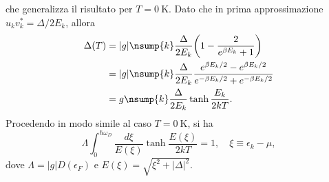 che generalizza il risultato per $T = \SI{0}{\kelvin}$. Dato che in prima approssimazione $u_kv_k^* = \Delta/2E_k$, allora
\begin{equation}
    \begin{split}
        \Delta(T) &= |g|\nsump{k}\frac{\Delta}{2E_k}\bigg(1 - \frac{2}{e^{\beta E_k} + 1}\bigg) \\
        &= |g|\nsump{k}\frac{\Delta}{2E_k}\frac{e^{\beta E_k/2} - e^{\beta E_k/2}}{e^{-\beta E_k/2} + e^{-\beta E_k/2}} \\
        &= g\nsump{k}\frac{\Delta}{2E_k}\tanh{\frac{E_k}{2kT}}.
    \end{split}
\end{equation}
Procedendo in modo simile al caso $T = \SI{0}{\kelvin}$, si ha
\begin{equation}
\label{eq: equazione del gap di energia BCS}
    \Lambda\int_0^{\hbar\omega_D}\frac{d\xi}{E(\xi)}\tanh{\frac{E(\xi)}{2kT}} = 1,\quad \xi \equiv \epsilon_k - \mu,
\end{equation}
dove $\Lambda = |g|D(\epsilon_F)$ e $E(\xi) = \sqrt{\xi^2 + |\Delta|^2}$.

